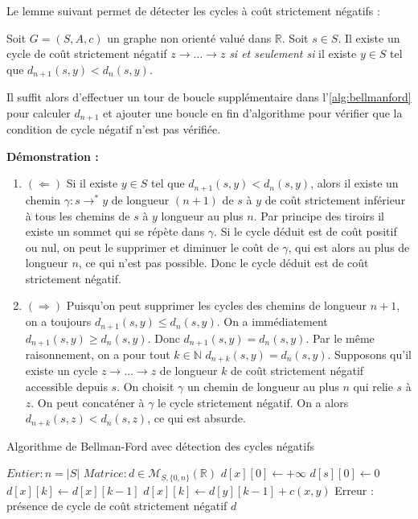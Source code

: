 \documentclass[../../../main.tex]{subfiles}
\begin{document}
Le lemme suivant permet de détecter les cycles à coût strictement négatifs :

 Soit $G = (S, A, c)$ un graphe non orienté valué dans $\mathbb{R}$. Soit $s\in S$. Il existe un cycle de coût strictement négatif $z\rightarrow \dots \rightarrow z$ \textit{si et seulement si} il existe $y\in S$ tel que $d_{n+1}(s, y) < d_n(s, y)$.

Il suffit alors d'effectuer un tour de boucle supplémentaire dans l'\ref{alg:bellmanford} pour calculer $d_{n+1}$ et ajouter une boucle en fin d'algorithme pour vérifier que la condition de cycle négatif n'est pas vérifiée.

\textbf{Démonstration :}
\begin{enumerate}
	\item $(\Leftarrow)$ Si il existe $y\in S$ tel que $d_{n+1}(s, y) < d_{n}(s, y)$, alors il existe un chemin $\gamma:s\rightarrow^* y$ de longueur $(n+1)$ de $s$ à $y$ de coût strictement inférieur à tous les chemins de $s$ à $y$ longueur au plus $n$. Par principe des tiroirs il existe un sommet qui se répète dans $\gamma$. Si le cycle déduit est de coût positif ou nul, on peut le supprimer et diminuer le coût de $\gamma$, qui est alors au plus de longueur $n$, ce qui n'est pas possible. Donc le cycle déduit est de coût strictement négatif.
	\item $(\Rightarrow)$ Puisqu'on peut supprimer les cycles des chemins de longueur $n+1$, on a toujours $d_{n+1}(s, y)\leq d_{n}(s, y)$. On a immédiatement $d_{n+1}(s, y) \geq d_n(s, y)$. Donc $d_{n+1}(s, y) = d_n(s, y)$. Par le même raisonnement, on a pour tout $k\in\mathbb{N}$ $d_{n+k}(s, y) = d_n(s, y)$. Supposons qu'il existe un cycle $z\rightarrow \dots \rightarrow z$ de longueur $k$ de coût strictement négatif accessible depuis $s$. On choisit $\gamma$ un chemin de longueur au plus $n$ qui relie $s$ à $z$. On peut concaténer à $\gamma$ le cycle strictement négatif. On a alors $d_{n+k}(s, z) < d_{n}(s, z)$, ce qui est absurde.
\end{enumerate}
\begin{algorithm}
\caption{Algorithme de Bellman-Ford avec détection des cycles négatifs\label{alg:bellmanford-detect}}
$Entier:n = |S|$
$Matrice:d\in \mathcal{M}_{S, \{0, n\}}(\mathbb{R})$
 {
	$d[x][0]\leftarrow +\infty$\;
}
$d[s][0]\leftarrow 0$\;
 {
	 {
		$d[x][k] \leftarrow d[x][k-1]$\;
	}
	 {
		 {
			 {
				$d[x][k] \leftarrow d[y][k-1] + c(x, y)$
			}
		}
	}
}
 {
	 {
		\Return Erreur : présence de cycle de coût strictement négatif\;
	}
}
\Return $d$
\end{algorithm}
\end{document}
